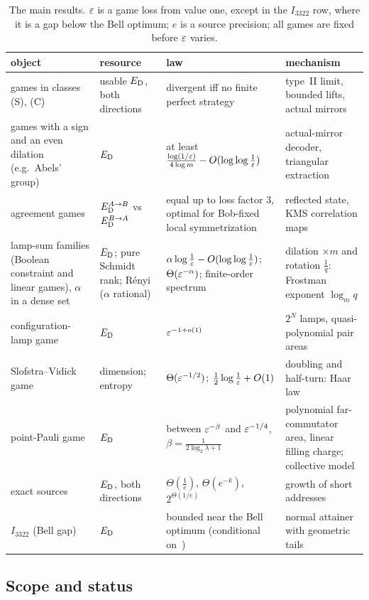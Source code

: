 \begin{table}[ht]
\centering\small\setlength{\tabcolsep}{3pt}
\begin{tabular}{@{}L{0.24\textwidth}L{0.2\textwidth}L{0.24\textwidth}L{0.26\textwidth}@{}}
\toprule
object & resource & law & mechanism\\
\midrule
games in classes (S), (C) & usable $E_{\mathrm D}$, both directions & divergent iff no finite perfect strategy & type~II limit, bounded lifts, actual
mirrors\\
games with a sign and an even dilation (e.g.\ Abels' group) & $E_{\mathrm D}$ & at least $\frac{\log(1/\varepsilon)}{4\log m}-O(\log\log\frac1{\varepsilon})$ &
actual-mirror decoder, triangular extraction\\
agreement games & $E_{\mathrm D}^{A\to B}$ vs $E_{\mathrm D}^{B\to A}$ & equal up to loss factor $3$, optimal for Bob-fixed local symmetrization &
reflected state, KMS correlation maps\\
lamp-sum families (Boolean constraint and linear games), $\alpha$ in a dense set & $E_{\mathrm D}$; pure Schmidt rank; R\'enyi ($\alpha$ rational) &
$\alpha\log\frac1{\varepsilon}-O(\log\log\frac1{\varepsilon})$; $\Theta(\varepsilon^{-\alpha})$; finite-order spectrum & dilation $\times m$ and rotation $\frac1q$:
Frostman exponent $\log_mq$\\
configuration-lamp game & $E_{\mathrm D}$ & $\varepsilon^{-1+o(1)}$ & $2^N$ lamps, quasi-polynomial pair areas\\
Slofstra--Vidick game & dimension; entropy & $\Theta(\varepsilon^{-1/2})$; $\frac12\log\frac1{\varepsilon}+O(1)$ & doubling and half-turn: Haar law\\
point-Pauli game & $E_{\mathrm D}$ & between $\varepsilon^{-\beta}$ and $\varepsilon^{-1/4}$, $\beta=\frac1{2\log_2\lambda+1}$ & polynomial far-commutator
area, linear filling charge; collective model\\
exact sources & $E_{\mathrm D}$, both directions & $\Theta(\frac1e)$, $\Theta(e^{-k})$, $2^{\Theta(1/e)}$ & growth of short addresses\\
$I_{3322}$ (Bell gap) & $E_{\mathrm D}$ & bounded near the Bell optimum (conditional on~\cite{Dou26}) & normal attainer with geometric
tails\\
\bottomrule
\end{tabular}
\caption{The main results. $\eps$ is a game loss from value one, except in the $I_{3322}$ row, where it is a gap below the Bell
optimum; $e$ is a source precision; all games are fixed before $\eps$ varies.}
\label{tab:map}
\end{table}

\FloatBarrier
\subsection{Scope and status}\label{sec:status}

